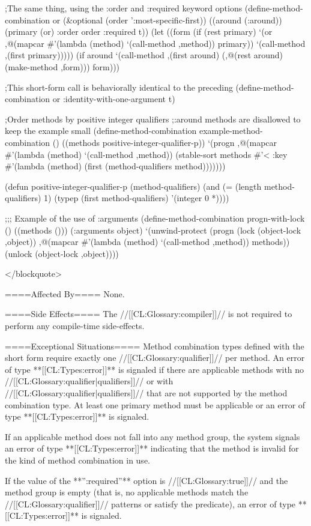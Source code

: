 ;The same thing, using the :order and :required keyword options (define-method-combination or (&optional (order ':most-specific-first)) ((around (:around)) (primary (or) :order order :required t)) (let ((form (if (rest primary) `(or ,@(mapcar #'(lambda (method) `(call-method ,method)) primary)) `(call-method ,(first primary))))) (if around `(call-method ,(first around) (,@(rest around) (make-method ,form))) form)))

;This short-form call is behaviorally identical to the preceding (define-method-combination or :identity-with-one-argument t)

;Order methods by positive integer qualifiers ;:around methods are disallowed to keep the example small (define-method-combination example-method-combination () ((methods positive-integer-qualifier-p)) `(progn ,@(mapcar #'(lambda (method) `(call-method ,method)) (stable-sort methods #'< :key #'(lambda (method) (first (method-qualifiers method)))))))

(defun positive-integer-qualifier-p (method-qualifiers) (and (= (length method-qualifiers) 1) (typep (first method-qualifiers) '(integer 0 *))))

;;; Example of the use of :arguments (define-method-combination progn-with-lock () ((methods ())) (:arguments object) `(unwind-protect (progn (lock (object-lock ,object)) ,@(mapcar #'(lambda (method) `(call-method ,method)) methods)) (unlock (object-lock ,object))))

</blockquote>

====Affected By====
None.

====Side Effects====
The //[[CL:Glossary:compiler]]// is not required to perform any compile-time side-effects.

====Exceptional Situations====
Method combination types defined with the short form require exactly one //[[CL:Glossary:qualifier]]// per method. An error of type **[[CL:Types:error]]** is signaled if there are applicable methods with no //[[CL:Glossary:qualifier|qualifiers]]// or with //[[CL:Glossary:qualifier|qualifiers]]// that are not supported by the method combination type. At least one primary method must be applicable or an error of type **[[CL:Types:error]]** is signaled.

If an applicable method does not fall into any method group, the system signals an error of type **[[CL:Types:error]]** indicating that the method is invalid for the kind of method combination in use.

If the value of the **'':required''** option is //[[CL:Glossary:true]]// and the method group is empty (that is, no applicable methods match the //[[CL:Glossary:qualifier]]// patterns or satisfy the predicate), an error of type **[[CL:Types:error]]** is signaled.

